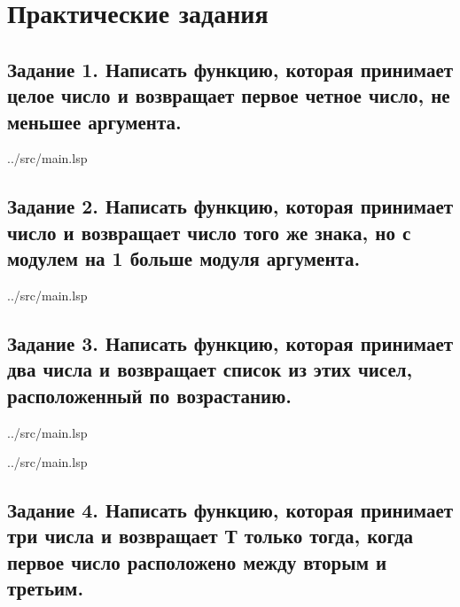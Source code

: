 \chapter{Практические задания}

\section*{Задание 1. Написать функцию, которая принимает целое число и возвращает первое четное число, не меньшее аргумента.}

\begin{lstinputlisting}[
	caption={Задание 1},
	label={lst:t1},
	style={lsp},
	linerange={1-4},
	]{../src/main.lsp}
\end{lstinputlisting}

\section*{Задание 2. Написать функцию, которая принимает число и возвращает число того же знака, но с модулем на 1 больше модуля аргумента.}

\begin{lstinputlisting}[
	caption={Задание 2},
	label={lst:t2},
	style={lsp},
	linerange={6-9},
	]{../src/main.lsp}
\end{lstinputlisting}

\section*{Задание 3.  Написать функцию, которая принимает два числа и возвращает список из этих чисел, расположенный по возрастанию.}

\begin{lstinputlisting}[
	caption={Задание 3, вариант 1},
	label={lst:t3-1},
	style={lsp},
	linerange={11-14},
	]{../src/main.lsp}
\end{lstinputlisting}

\begin{lstinputlisting}[
	caption={Задание 3, вариант 2},
	label={lst:t3-2},
	style={lsp},
	linerange={16-17},
	]{../src/main.lsp}
\end{lstinputlisting}

\section*{Задание 4. Написать функцию, которая принимает три числа и возвращает Т только тогда, когда первое число расположено между вторым и третьим.}

